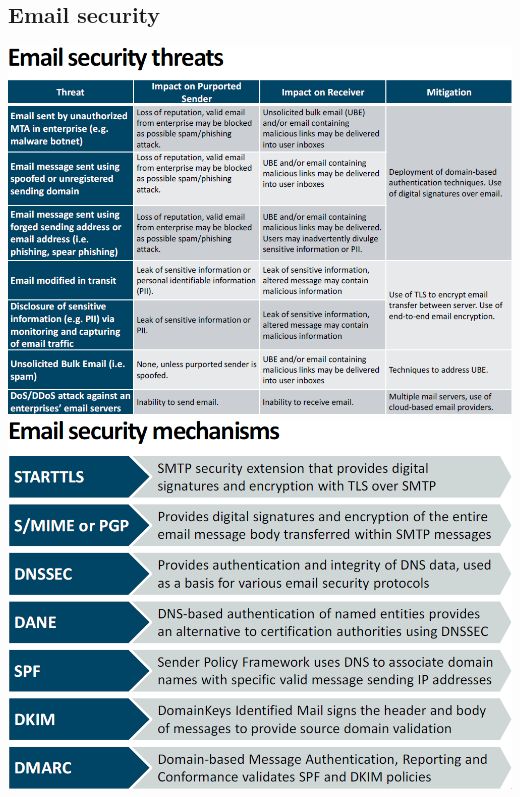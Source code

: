 \documentclass[12pt]{article}
\begin{document}
 \subsection{Email security}
 \includegraphics[width=1.2\linewidth]{./slides/L8P1THR.PNG}\\
 \includegraphics[width=0.8\linewidth]{./slides/L8P1MECH.PNG}\\
\end{document}
